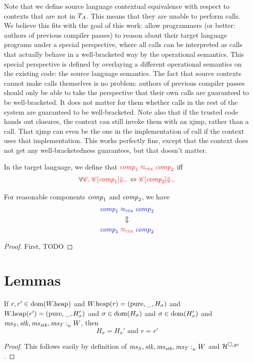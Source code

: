 \documentclass[a4paper]{article}
\begin{document}
Note that we define source language contextual equivalence with respect to contexts that are not in $T_{A}$.
This means that they are unable to perform calls.
We believe this fits with the goal of this work: allow programmers (or better: authors of previous compiler passes) to reason about their target language programs under a special perspective, where all calls can be interpreted as calls that actually behave in a well-bracketed way by the operational semantics.
This special perspective is defined by overlaying a different operational semantics on the existing code: the source language semantics.
The fact that source contexts cannot make calls themselves is no problem: authors of previous compiler passes should only be able to take the perspective that their own calls are guaranteed to be well-bracketed.
It does not matter for them whether calls in the rest of the system are guaranteed to be well-bracketed.
Note also that if the trusted code hands out closures, the context can still invoke them with an xjmp, rather than a call.
That xjmp can even be the one in the implementation of call if the context uses that implementation. 
This works perfectly fine, except that the context does not get any well-bracketedness guarantees, but that doesn't matter.

\begin{definition}
  In the target language, we define that ${\color{red} \mathit{comp}_1 \mathrel{{\color{red} \approx_{\mathrm{ctx}}}} \mathit{comp}_2}$ iff
  \begin{equation*}
    \forall {\color{red} \mathscr{C}} \ldotp {\color{red} \mathscr{C}[\mathit{comp}_1] {\Downarrow_{-}}} \Leftrightarrow {\color{red} \mathscr{C}[\mathit{comp}_2] {\Downarrow_{-}}}
  \end{equation*}
\end{definition}

\begin{theorem}
  \label{thm:full-abstraction}
  For reasonable components $\mathit{comp}_1$ and $\mathit{comp}_2$, we have
  \begin{gather*}
    {\color{blue}\mathit{comp}_1} \mathrel{{\color{blue} \approx_{\mathrm{ctx}}}} {\color{blue} \mathit{comp}_2}\\
    \Updownarrow\\
    {\color{blue} \mathit{comp}_1} \mathrel{{\color{red} \approx_{\mathrm{ctx}}}} {\color{blue} \mathit{comp}_2}
  \end{gather*}
\end{theorem}
\begin{proof}
  First, 
  TODO
\end{proof}

\section{Lemmas}
\begin{lemma}
  \label{lem:unique-h-sigma}
  If $r,r' \in \mathrm{dom}(W.\mathrm{heap})$ and $W.\mathrm{heap}(r) = (\mathrm{pure},\_,H_\sigma)$
  and $W.\mathrm{heap}(r') = (\mathrm{pure},\_,H_\sigma')$ and $\sigma \in \mathrm{dom}(H_\sigma)$
  and $\sigma \in \mathrm{dom}(H_\sigma')$ and $\mathit{ms}_S,\mathit{stk},\mathit{ms}_{\mathit{stk}},\mathit{ms}_T :_{n}^{}W$,
  then
  \[
    H_\sigma = H_\sigma' \text{ and } r = r'
  \]
\end{lemma}
\begin{proof}
  This follows easily by definition of $\mathit{ms}_S,\mathit{stk},\mathit{ms}_{\mathit{stk}},\mathit{ms}_T :_{n}^{}W$ and $\mathcal{H}^{\square,\mathit{gc}}$.
\end{proof}
\end{document}
